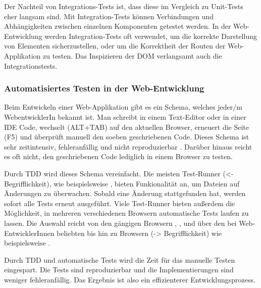 {Der Nachteil von Integrations-Tests ist, dass diese im Vergleich zu Unit-Tests eher langsam sind. Mit Integration-Tests können Verbindungen und Abhängigkeiten zwischen einzelnen Komponenten getestet werden. In der Web-Entwicklung werden Integration-Tests oft verwendet, um die korrekte Darstellung von Elementen sicherzustellen, oder um die Korrektheit der Routen der Web-Applikation zu testen. 
Das Inspizieren der DOM verlangsamt auch die Integrationstests.

\subsubsection{Automatisiertes Testen in der Web-Entwicklung}
Beim Entwickeln einer Web-Applikation gibt es ein Schema, welches jeder/m WebentwicklerIn bekannt ist. Man schreibt in einem Text-Editor oder in einer IDE Code, wechselt (ALT+TAB) auf den aktuellen Browser, erneuert die Seite (F5) und überprüft manuell den soeben geschriebenen Code. Dieses Schema ist sehr zeitintensiv, fehleranfällig und nicht reproduzierbar \autocite[3]{Johansen:2011}. Darüber hinaus reicht es oft nicht, den geschriebenen Code lediglich in einem Browser zu testen.

Durch TDD wird dieses Schema vereinfacht. Die meisten Test-Runner (<- Begrifflichkeit), wie beispielsweise , bieten Funkionalität an, um Dateien auf Änderungen zu überwachen. Sobald eine Änderung stattgefunden hat, werden sofort alle Tests erneut ausgeführt. Viele Test-Runner bieten außerdem die Möglichkeit, in mehreren verschiedenen Browsern automatische Tests laufen zu lassen. Die Auswahl reicht von den gängigen Browsern , ,  und  über den bei Web-EntwicklerInnen beliebten  bis hin zu  Browsern (-> Begrifflichkeit) wie beispielsweise .

Durch TDD und automatische Tests wird die Zeit für das manuelle Testen eingespart. Die Tests sind reproduzierbar und die Implementierungen sind weniger fehleranfällig. Das Ergebnis ist also ein effizienterer Entwicklungsprozess.

}
